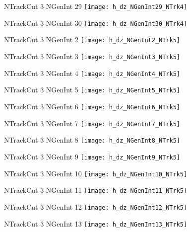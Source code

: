 \documentclass[8pt]{beamer}
\begin{document}
\begin{frame}
\center
\large{NTrackCut 3 NGenInt 29}
\texttt{[image: h\_dz\_NGenInt29\_NTrk4]}
\end{frame}
\begin{frame}
\center
\large{NTrackCut 3 NGenInt 30}
\texttt{[image: h\_dz\_NGenInt30\_NTrk4]}
\end{frame}
\begin{frame}
\center
\large{NTrackCut 3 NGenInt 2}
\texttt{[image: h\_dz\_NGenInt2\_NTrk5]}
\end{frame}
\begin{frame}
\center
\large{NTrackCut 3 NGenInt 3}
\texttt{[image: h\_dz\_NGenInt3\_NTrk5]}
\end{frame}
\begin{frame}
\center
\large{NTrackCut 3 NGenInt 4}
\texttt{[image: h\_dz\_NGenInt4\_NTrk5]}
\end{frame}
\begin{frame}
\center
\large{NTrackCut 3 NGenInt 5}
\texttt{[image: h\_dz\_NGenInt5\_NTrk5]}
\end{frame}
\begin{frame}
\center
\large{NTrackCut 3 NGenInt 6}
\texttt{[image: h\_dz\_NGenInt6\_NTrk5]}
\end{frame}
\begin{frame}
\center
\large{NTrackCut 3 NGenInt 7}
\texttt{[image: h\_dz\_NGenInt7\_NTrk5]}
\end{frame}
\begin{frame}
\center
\large{NTrackCut 3 NGenInt 8}
\texttt{[image: h\_dz\_NGenInt8\_NTrk5]}
\end{frame}
\begin{frame}
\center
\large{NTrackCut 3 NGenInt 9}
\texttt{[image: h\_dz\_NGenInt9\_NTrk5]}
\end{frame}
\begin{frame}
\center
\large{NTrackCut 3 NGenInt 10}
\texttt{[image: h\_dz\_NGenInt10\_NTrk5]}
\end{frame}
\begin{frame}
\center
\large{NTrackCut 3 NGenInt 11}
\texttt{[image: h\_dz\_NGenInt11\_NTrk5]}
\end{frame}
\begin{frame}
\center
\large{NTrackCut 3 NGenInt 12}
\texttt{[image: h\_dz\_NGenInt12\_NTrk5]}
\end{frame}
\begin{frame}
\center
\large{NTrackCut 3 NGenInt 13}
\texttt{[image: h\_dz\_NGenInt13\_NTrk5]}
\end{frame}
\end{document}
